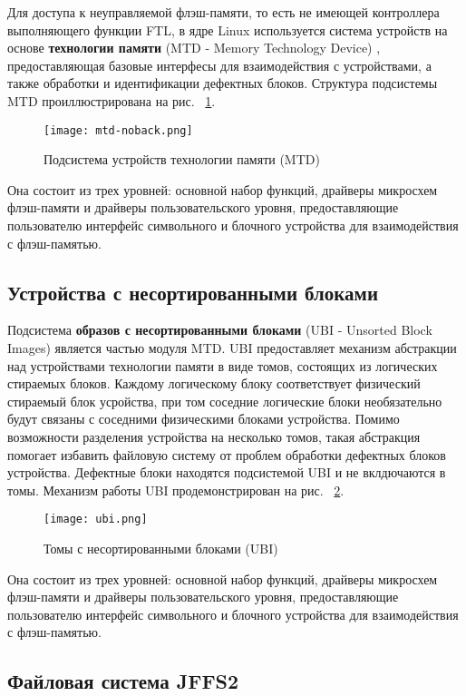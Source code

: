 Для доступа к неуправляемой флэш-памяти, то есть не имеющей контроллера выполняющего функции FTL, в ядре Linux используется система устройств на основе \textbf{технологии памяти} (MTD - Memory Technology Device) \cite{mtd}, предоставляющая базовые интерфесы для взаимодействия с устройствами, а также обработки и идентификации дефектных блоков. Структура подсистемы MTD проиллюстрирована на рис. ~\ref{mtdfigure}.

\begin{figure}[H]
	\centering
	\texttt{[image: mtd-noback.png]}
	\caption{Подсистема устройств технологии памяти (MTD)}
	\label{mtdfigure}
\end{figure}

Она состоит из трех уровней: основной набор функций, драйверы микросхем флэш-памяти и драйверы пользовательского уровня, предоставляющие пользователю интерфейс символьного и блочного устройства для взаимодействия с флэш-памятью. 

\subsection{Устройства с несортированными блоками}

Подсистема \textbf{образов с несортированными блоками} (UBI - Unsorted Block Images) является частью модуля MTD. UBI предоставляет механизм абстракции над устройствами технологии памяти в виде томов, состоящих из логических стираемых блоков. Каждому логическому блоку соответствует физический стираемый блок усройства, при том соседние логические блоки необязательно будут связаны с соседними физическими блоками устройства. Помимо возможности разделения устройства на несколько томов, такая абстракция помогает избавить файловую систему от проблем обработки дефектных блоков устройства. Дефектные блоки находятся подсистемой UBI и не вклдючаются в томы. Механизм работы UBI продемонстрирован  на рис. ~\ref{ubifigure}.

\begin{figure}[H]
	\centering
	\texttt{[image: ubi.png]}
	\caption{Томы с несортированными блоками (UBI)}
	\label{ubifigure}
\end{figure}

Она состоит из трех уровней: основной набор функций, драйверы микросхем флэш-памяти и драйверы пользовательского уровня, предоставляющие пользователю интерфейс символьного и блочного устройства для взаимодействия с флэш-памятью. 

\subsection{Файловая система JFFS2}

